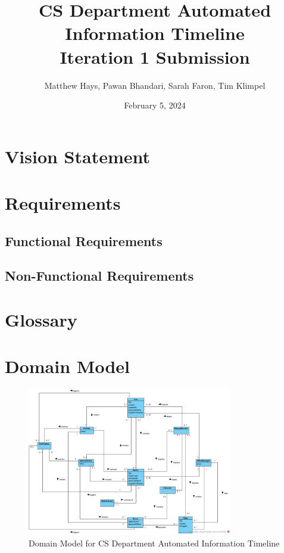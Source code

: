 \documentclass{article}
\title{CS Department Automated Information Timeline \\ Iteration 1 Submission}
\date{February 5, 2024}
\author{Matthew Hays, Pawan Bhandari, Sarah Faron, Tim Klimpel}
\begin{document}
\maketitle
\newpage
\tableofcontents
\listoffigures
\newpage
\section{Vision Statement}

\section{Requirements}
\subsection{Functional Requirements}



\subsection{Non-Functional Requirements}



\section{Glossary}



\section{Domain Model}
\begin{figure}[H]
    \centering
    \includegraphics[width=0.8\textwidth]{images/DomainModel.jpg}
    \centering
    \caption{Domain Model for CS Department Automated Information Timeline}
\end{figure}
\end{document}
